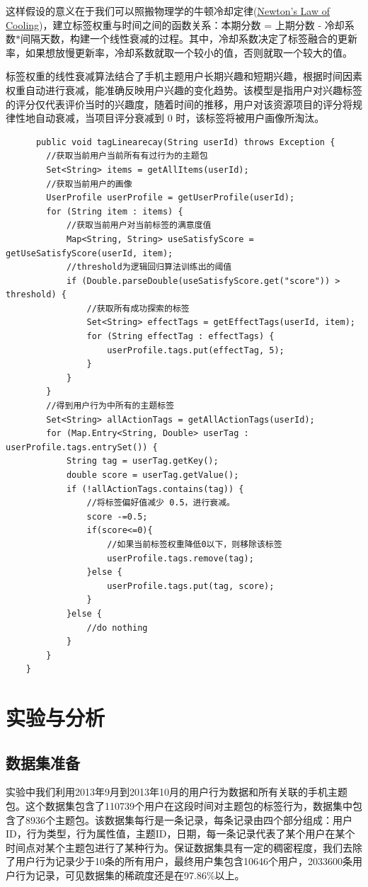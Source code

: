   这样假设的意义在于我们可以照搬物理学的牛顿冷却定律(\href{http://www.evanmiller.org/rank-hotness-with-newtons-law-of-cooling.html}{Newton's Law of Cooling})，建立标签权重与时间之间的函数关系：本期分数 = 上期分数 - 冷却系数$*$间隔天数，构建一个线性衰减的过程。其中，冷却系数决定了标签融合的更新率，如果想放慢更新率，冷却系数就取一个较小的值，否则就取一个较大的值。

  标签权重的线性衰减算法结合了手机主题用户长期兴趣和短期兴趣，根据时间因素权重自动进行衰减，能准确反映用户兴趣的变化趋势。该模型是指用户对兴趣标签的评分仅代表评价当时的兴趣度，随着时间的推移，用户对该资源项目的评分将规律性地自动衰减，当项目评分衰减到 0 时，该标签将被用户画像所淘汰。
  \begin{lstlisting}
      public void tagLinearecay(String userId) throws Exception {
        //获取当前用户当前所有有过行为的主题包
        Set<String> items = getAllItems(userId);
        //获取当前用户的画像
        UserProfile userProfile = getUserProfile(userId);
        for (String item : items) {
            //获取当前用户对当前标签的满意度值
            Map<String, String> useSatisfyScore = getUseSatisfyScore(userId, item);
            //threshold为逻辑回归算法训练出的阈值
            if (Double.parseDouble(useSatisfyScore.get("score")) > threshold) {
                //获取所有成功探索的标签
                Set<String> effectTags = getEffectTags(userId, item);
                for (String effectTag : effectTags) {
                    userProfile.tags.put(effectTag, 5);
                }
            }
        }
        //得到用户行为中所有的主题标签
        Set<String> allActionTags = getAllActionTags(userId);
        for (Map.Entry<String, Double> userTag : userProfile.tags.entrySet()) {
            String tag = userTag.getKey();
            double score = userTag.getValue();
            if (!allActionTags.contains(tag)) {
                //将标签偏好值减少 0.5，进行衰减。
                score -=0.5;
                if(score<=0){
                    //如果当前标签权重降低0以下，则移除该标签
                    userProfile.tags.remove(tag);  
                }else {
                    userProfile.tags.put(tag, score);
                }
            }else {
                //do nothing
            }
        }
    }
  \end{lstlisting}


\section{实验与分析}
  \subsection{数据集准备}
  实验中我们利用2013年9月到2013年10月的用户行为数据和所有关联的手机主题包。这个数据集包含了110739个用户在这段时间对主题包的标签行为，数据集中包含了8936个主题包。该数据集每行是一条记录，每条记录由四个部分组成：用户ID，行为类型，行为属性值，主题ID，日期，每一条记录代表了某个用户在某个时间点对某个主题包进行了某种行为。保证数据集具有一定的稠密程度，我们去除了用户行为记录少于10条的所有用户，最终用户集包含10646个用户，2033600条用户行为记录，可见数据集的稀疏度还是在97.86\%以上。
